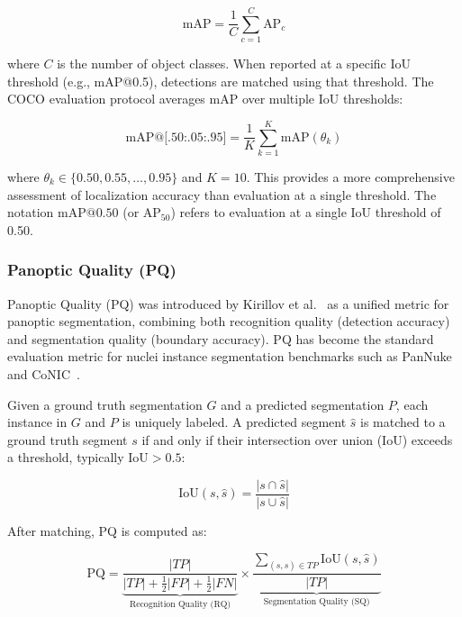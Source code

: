 \begin{equation}
	\text{mAP} = \frac{1}{C} \sum_{c=1}^{C} \text{AP}_c
\end{equation}

where $C$ is the number of object classes. When reported at a specific IoU threshold (e.g., mAP@0.5), detections are matched using that threshold. The COCO evaluation protocol averages mAP over multiple IoU thresholds:

\begin{equation}
    \text{mAP@[.50:.05:.95]} = \frac{1}{K} \sum_{k=1}^{K} \text{mAP}(\theta_k)
\end{equation}

where $\theta_k \in \{0.50, 0.55, \ldots, 0.95\}$ and $K = 10$. This provides a more comprehensive assessment of localization accuracy than evaluation at a single threshold. The notation $\text{mAP}@0.50$ (or $\text{AP}_{50}$) refers to evaluation at a single IoU threshold of 0.50.

\subsubsection{Panoptic Quality (PQ)}

Panoptic Quality (PQ) was introduced by Kirillov et al.~\cite{kirillov2019panoptic} as a unified metric for panoptic segmentation, combining both recognition quality (detection accuracy) and segmentation quality (boundary accuracy). PQ has become the standard evaluation metric for nuclei instance segmentation benchmarks such as PanNuke~\cite{gamper2020pannuke} and CoNIC~\cite{graham2021conic}.

Given a ground truth segmentation $G$ and a predicted segmentation $P$, each instance in $G$ and $P$ is uniquely labeled. A predicted segment $\hat{s}$ is matched to a ground truth segment $s$ if and only if their intersection over union (IoU) exceeds a threshold, typically $\text{IoU} > 0.5$:

\begin{equation}
	\text{IoU}(s, \hat{s}) = \frac{|s \cap \hat{s}|}{|s \cup \hat{s}|}
\end{equation}

After matching, PQ is computed as:

\begin{equation}
	\text{PQ} = \underbrace{\frac{|TP|}{|TP| + \frac{1}{2}|FP| + \frac{1}{2}|FN|}}_{\text{Recognition Quality (RQ)}} \times \underbrace{\frac{\sum_{(s,\hat{s}) \in TP} \text{IoU}(s, \hat{s})}{|TP|}}_{\text{Segmentation Quality (SQ)}}
\end{equation}

